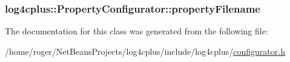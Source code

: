 \hypertarget{classlog4cplus_1_1PropertyConfigurator_a0f0985dd811ee13b96068a6fc1932287}{
\subsubsection[{property\-Filename}]{ log4cplus\-::\-Property\-Configurator\-::property\-Filename\hspace{0.3cm}{\ttfamily [protected]}}}\label{classlog4cplus_1_1PropertyConfigurator_a0f0985dd811ee13b96068a6fc1932287}


The documentation for this class was generated from the following file\-:\begin{DoxyCompactItemize}
\item 
/home/roger/\-Net\-Beans\-Projects/log4cplus/include/log4cplus/\hyperlink{configurator_8h}{configurator.\-h}\end{DoxyCompactItemize}
